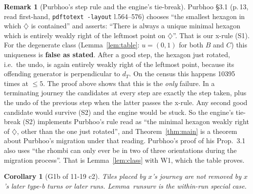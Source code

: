 \documentclass[11pt]{article}
\newtheorem{corollary}[theorem]{Corollary}
\theoremstyle{definition}\newtheorem{definition}[theorem]{Definition}\newtheorem{remark}[theorem]{Remark}
\begin{document}
\begin{remark}[Purbhoo's step rule and the engine's tie-break]\label{rem:purbhoo}
Purbhoo \S3.1 (p.\,13, read first-hand, \texttt{pdftotext -layout} l.564--576) chooses ``the smallest hexagon in which $\diamondsuit$ is contained'' and asserts: ``There is always a unique minimal hexagon which is entirely weakly right of the leftmost point on $\diamondsuit$''. That is our x-rule (S1).
For the degenerate class (Lemma~\ref{lem:table}: $u=(0,1)$ for both $B$ and $C$) this uniqueness is \textbf{false as stated}. After a good step, the hexagon just rotated, i.e.\ the undo, is again entirely weakly right of the leftmost point, because its offending generator is perpendicular to $d_T$. On the census this happens 10395 times at $\le5$.
The proof above shows that this is the \emph{only} failure. In a terminating journey the candidates at every step are exactly the step taken, plus the undo of the previous step when the latter passes the x-rule. Any second good candidate would survive (S2) and the engine would be stuck.
So the engine's tie-break (S2) implements Purbhoo's rule read as ``the minimal hexagon weakly right of $\diamondsuit$, other than the one just rotated'', and Theorem~\ref{thm:main} is a theorem about Purbhoo's migration under that reading.
Purbhoo's proof of his Prop.~3.1 also uses ``the rhombi can only ever be in two of three orientations during the migration process''. That is Lemma~\ref{lem:class} with W1, which the table proves.
\end{remark}

\begin{corollary}[G1b of 11-19 c2]
Tiles placed by $x$'s journey are not removed by $x$'s later type-b turns or later runs. Lemma~runsurv is the within-run special case.
\end{corollary}
\end{document}
